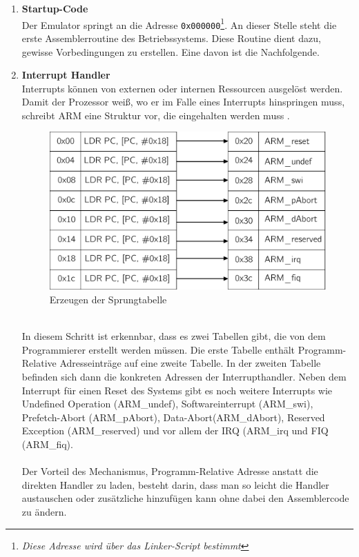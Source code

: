	\begin{enumerate}
		\item{\textbf{Startup-Code}}\\
		 Der Emulator springt an die Adresse \texttt{0x000000}\footnote{\textit{Diese Adresse wird \"uber das Linker-Script bestimmt}}. An dieser Stelle steht die erste Assemblerroutine des Betriebssystems. Diese Routine dient dazu, gewisse Vorbedingungen zu erstellen. Eine davon ist die Nachfolgende.
		 \item{\textbf{Interrupt Handler}}\\
		 \label{draft:exceptionHandler}
Interrupts k\"onnen von externen oder internen Ressourcen ausgel\"ost werden. Damit der Prozessor wei{\ss}, wo er im Falle eines Interrupts hinspringen muss, schreibt ARM eine Struktur vor, die eingehalten werden muss \parencite[vgl.][54]{archManI}. 
			\begin{figure}[h]
				\centering
					\includegraphics[scale=0.6]{common/exceptionhandler.pdf}
				\caption{Erzeugen der Sprungtabelle}
				\label{draft:excptionTable}
			\end{figure}\\
			In diesem Schritt ist erkennbar, dass es zwei Tabellen gibt, die von dem Programmierer erstellt werden m\"ussen. Die erste Tabelle enth\"alt Programm-Relative Adresseintr\"age auf eine zweite Tabelle. In der zweiten Tabelle befinden sich dann die konkreten Adressen der Interrupthandler. Neben dem Interrupt f\"ur einen Reset des Systems gibt es noch weitere Interrupts wie Undefined Operation (ARM\_undef), Softwareinterrupt (ARM\_swi), Prefetch-Abort (ARM\_pAbort), Data-Abort(ARM\_dAbort), Reserved Exception (ARM\_reserved) und vor allem der IRQ (ARM\_irq und FIQ (ARM\_fiq).\\\\
Der Vorteil des Mechanismus, Programm-Relative Adresse anstatt die direkten Handler zu laden, besteht darin, dass man so leicht die Handler austauschen oder zus\"atzliche hinzuf\"ugen kann ohne dabei den Assemblercode zu \"andern.\\

\end{enumerate}

